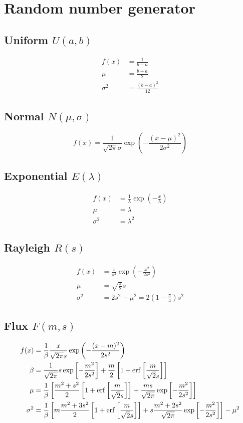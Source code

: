 \documentclass[10pt,a4paper]{article}
\begin{document}
\section{Random number generator}

\subsection{Uniform $U(a,b)$}
\begin{align}
f(x)&=\frac{1}{b-a}\\
\mu&=\frac{b+a}{2}\\
\sigma^2&=\frac{(b-a)^2}{12}
\end{align}

\subsection{Normal $N(\mu,\sigma)$}
\begin{equation}
f(x)=\frac{1}{\sqrt{2\pi}\sigma}\exp\left(-\frac{(x-\mu)^2}{2\sigma^2}\right)
\end{equation}

\subsection{Exponential $E(\lambda)$}
\begin{align}
f(x)&=\frac{1}{\lambda}\exp\left(-\frac{x}{\lambda}\right)\\
\mu&=\lambda\\
\sigma^2&=\lambda^2
\end{align}

\subsection{Rayleigh $R(s)$}
\begin{align}
f(x)&=\frac{x}{s^2}\exp\left(-\frac{x^2}{2s^2}\right)\\
\mu&=\sqrt{\frac{\pi}{2}}s\\
\sigma^2&=2s^2-\mu^2=2\left(1-\frac{\pi}{4}\right)s^2
\end{align}

\subsection{Flux $F(m,s)$}
\begin{align}
f(x)&=\frac{1}{\beta}\frac{x}{\sqrt{2\pi}s}
\exp\left(-\frac{(x-m)^2}{2s^2}\right)\\
\beta&=\frac{1}{\sqrt{2\pi}}s\exp\left[-\frac{m^2}{2s^2}\right]+
\frac{m}{2}\left[1+\erf\left[\frac{m}{\sqrt{2}s}\right]\right]\\
\mu&=\frac{1}{\beta}\left[\frac{m^2+s^2}{2}\left[1+
\erf\left[\frac{m}{\sqrt{2}s}\right]\right]+
\frac{ms}{\sqrt{2\pi}}\exp\left[-\frac{m^2}{2s^2}\right]\right]\\
\sigma^2&=\frac{1}{\beta}\left[m\frac{m^2+3s^2}{2}
\left[1+\erf\left[\frac{m}{\sqrt{2}s}\right]\right]+
s\frac{m^2+2s^2}{\sqrt{2\pi}}\exp\left[-\frac{m^2}{2s^2}\right]\right]-\mu^2
\end{align}
\end{document}
